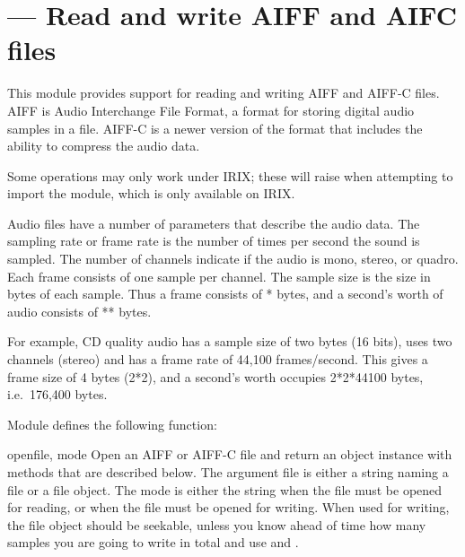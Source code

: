 \section{ ---
         Read and write AIFF and AIFC files}



This module provides support for reading and writing AIFF and AIFF-C
files.  AIFF is Audio Interchange File Format, a format for storing
digital audio samples in a file.  AIFF-C is a newer version of the
format that includes the ability to compress the audio data.

  Some operations may only work under IRIX; these will
raise  when attempting to import the
 module, which is only available on IRIX.

Audio files have a number of parameters that describe the audio data.
The sampling rate or frame rate is the number of times per second the
sound is sampled.  The number of channels indicate if the audio is
mono, stereo, or quadro.  Each frame consists of one sample per
channel.  The sample size is the size in bytes of each sample.  Thus a
frame consists of * bytes, and a
second's worth of audio consists of
** bytes.

For example, CD quality audio has a sample size of two bytes (16
bits), uses two channels (stereo) and has a frame rate of 44,100
frames/second.  This gives a frame size of 4 bytes (2*2), and a
second's worth occupies 2*2*44100 bytes, i.e.\ 176,400 bytes.

Module  defines the following function:

\begin{funcdesc}{open}{file, mode}
Open an AIFF or AIFF-C file and return an object instance with
methods that are described below.  The argument file is either a
string naming a file or a file object.  The mode is either the string
 when the file must be opened for reading, or 
when the file must be opened for writing.  When used for writing, the
file object should be seekable, unless you know ahead of time how many
samples you are going to write in total and use
 and .
\end{funcdesc}

